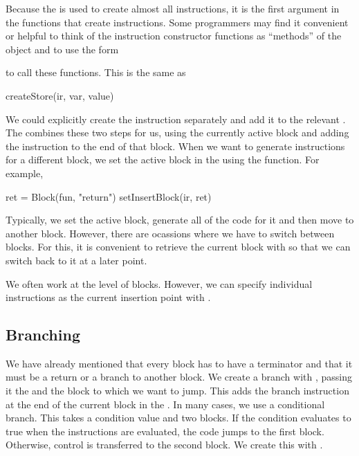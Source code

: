 Because the  is used to create almost all
instructions, it is the first argument in the functions
that create instructions.
Some programmers may find it convenient or helpful to 
think of the instruction constructor functions
as ``methods'' of the  object and
to use the form
to call these functions.
This is the same as
\begin{RCode}
createStore(ir, var, value)
\end{RCode}

We could explicitly create the instruction separately and add it to
the relevant .  The  combines these
two steps for us, using the currently active block and adding the
instruction to the end of that block.  When we want to generate
instructions for a different block, we set the active block in the
 using the  function.
For example, 
\begin{RCode}
ret = Block(fun, "return")
setInsertBlock(ir, ret)
\end{RCode}

Typically, we set the active block, generate all of the code for it
and then move to another block.  However, there are ocassions where we
have to switch between blocks. For this, it is convenient to retrieve
the current block with  so that we can switch
back to it at a later point.

We often work at the level of blocks. However, we can specify
individual instructions as the current insertion point
with .%








\subsection{Branching}
We have already mentioned that every block has to have a terminator
and that it must be a return or a branch to another block.  We create
a branch with , passing it the 
and the block to which we want to jump. This adds the branch
instruction at the end of the current block in the .
In many cases, we use a conditional branch.
This takes a condition value and two blocks.
If the condition evaluates to true when the instructions are
evaluated,
the code jumps to the first block. Otherwise, control is transferred to the second block.
We create this with .


